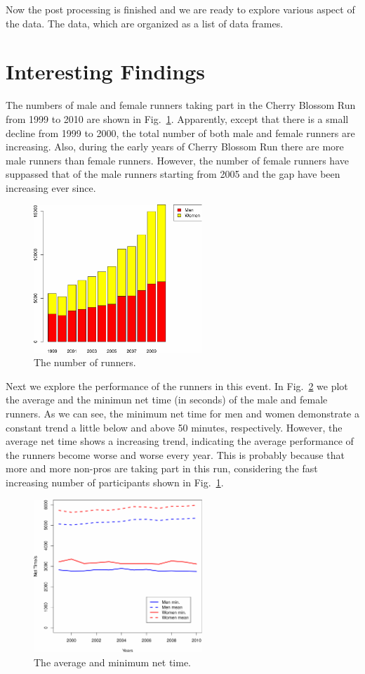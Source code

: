 \documentclass[twocolumn]{article}
\begin{document}
Now the post processing is finished and we are ready to explore various aspect
of the data. The data, which are organized as a list of data frames.

\section{Interesting Findings}
The numbers of male and female runners taking part in the Cherry Blossom Run
from 1999 to 2010 are shown in Fig.~\ref{fig:num_runner}. Apparently, except
that there is a small decline from 1999 to 2000, the total number of both
male and female runners are increasing. Also, during the early years of Cherry
Blossom Run there are more male runners than female runners. However, the number
of female runners have suppassed that of the male runners starting from 2005 and
the gap have been increasing ever since.

\begin{figure}[!h]
    \centering
    \includegraphics[width=2.5in]{figs/num_runner.pdf}
    \caption{The number of runners.}
    \label{fig:num_runner}
\end{figure}

Next we explore the performance of the runners in this event. In
Fig.~\ref{fig:time_net} we plot the average and the minimun net time (in
seconds) of the male and female runners. As we can see, the minimum net time for
men and women demonstrate a constant trend a little below and above 50 minutes,
respectively. However, the average net time shows a increasing trend, indicating
the average performance of the runners become worse and worse every year. This
is probably because that more and more non-pros are taking part in this run,
considering the fast increasing number of participants shown in
Fig.~\ref{fig:num_runner}.

\begin{figure}[!h]
    \centering
    \includegraphics[width=2.5in]{figs/time_net.pdf}
    \caption{The average and minimum net time.}
    \label{fig:time_net}
\end{figure}
\end{document}
